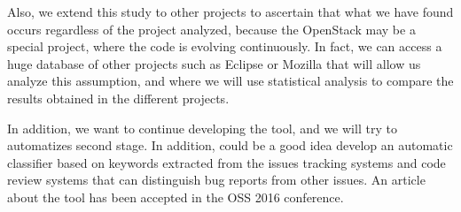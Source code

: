 \documentclass[ifip]{svmult}
\begin{document}
Also, we extend this study to other projects to ascertain that what we have found occurs regardless of the project analyzed, because the OpenStack may be a special project, where the code is evolving continuously. In fact, we can access a huge database of other projects such as Eclipse or Mozilla that will allow us analyze this assumption, and where we will use statistical analysis to compare the results obtained in the different projects.

In addition, we want to continue developing the tool, and we will try to automatizes second stage. In addition, could be a good idea develop an automatic classifier based on keywords extracted from the issues tracking systems and code review systems that can distinguish bug reports from other issues. An article about the tool has been accepted in the OSS 2016 conference.



\end{document}
